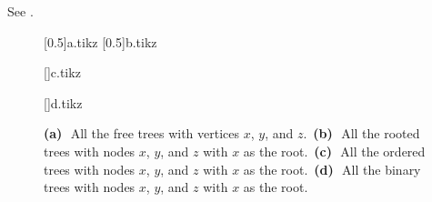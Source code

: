 See .
\begin{figure}[!htb]
    \subcaptionbox{\label{fig:B.5-1a}}[0.5\textwidth]{{a.tikz}}
    \subcaptionbox{\label{fig:B.5-1b}}[0.5\textwidth]{{b.tikz}}
    \par\vspace{10mm}
    \subcaptionbox{\label{fig:B.5-1c}}[\textwidth]{{c.tikz}}
    \par\vspace{10mm}
    \subcaptionbox{\label{fig:B.5-1d}}[\textwidth]{{d.tikz}}
    \caption{\textbf{(a)}\,~All the free trees with vertices $x$, $y$, and $z$.\,
    \textbf{(b)}\,~All the rooted trees with nodes $x$, $y$, and $z$ with $x$ as the root.\,
    \textbf{(c)}\,~All the ordered trees with nodes $x$, $y$, and $z$ with $x$ as the root.\,
    \textbf{(d)}\,~All the binary trees with nodes $x$, $y$, and $z$ with $x$ as the root.} \label{fig:B.5-1}
\end{figure}
